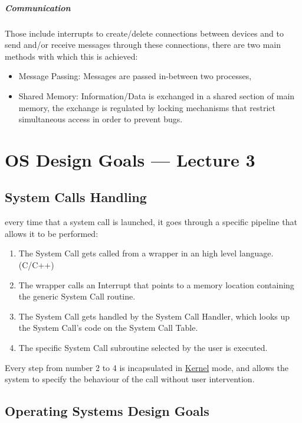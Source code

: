\documentclass[openright, twoside]{report}
\theoremstyle{definition}
\theoremstyle{example}
\begin{document}
			\paragraph{Communication}
			Those include interrupts to create/delete connections between devices and 
			to send and/or receive messages through these connections, there are two 
			main methods with which this is achieved:

			\begin{itemize}
				\item Message Passing: Messages are passed in-between two processes,
				\item Shared Memory: Information/Data is exchanged in a shared section 
				of main memory, the exchange is regulated by locking mechanisms that restrict
				simultaneous access in order to prevent bugs.
			\end{itemize}


	
	\chapter{OS Design Goals --- Lecture 3}
			\section{System Calls Handling}
				every time that a system call is launched, it goes through a specific 
				pipeline that allows it to be performed:
				\begin{enumerate}
					\item The System Call gets called from a wrapper in an high level 
					language. (C/C++)
					\item The wrapper calls an Interrupt that points to a memory location 
					containing the generic System Call routine.
					\item The System Call gets handled by the System Call Handler, which 
					looks up the System Call's code on the System Call Table.
					\item The specific System Call subroutine selected by the user is executed. 
				\end{enumerate}
				
				Every step from number 2 to 4 is incapsulated in 
				\hyperref[par:kernel]{Kernel} mode, and allows 
				the system to specify the behaviour of the call without 
				user intervention.

			\section{Operating Systems Design Goals}
\end{document}
